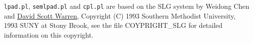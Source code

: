 \documentclass[a4paper,10pt]{scrartcl}
\begin{document}
\texttt{lpad.pl}, \texttt{semlpad.pl} and \texttt{cpl.pl} are based on the SLG system
by Weidong Chen and \href{http://www.cs.sunysb.edu/\string ~warren/}{David Scott Warren},  
Copyright (C) 1993 Southern Methodist University, 1993 SUNY at Stony Brook, see the file COYPRIGHT\_SLG for detailed information on this copyright.



\end{document}

